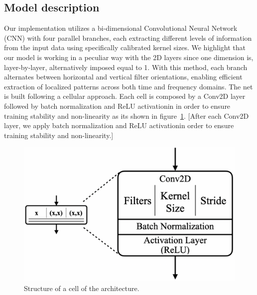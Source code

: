 \documentclass{article}
\begin{document}
\begin{sloppy}
\subsection{Model description}
\label{sec:model_description}
Our implementation utilizes a bi-dimensional Convolutional Neural Network (CNN)
with four parallel branches, each extracting different levels of information from the
input data using specifically calibrated kernel sizes. 
We highlight that our model is working in a peculiar way with the 2D layers since one dimension is, layer-by-layer, alternatively
imposed equal to 1. With this method, each branch alternates between horizontal and vertical filter orientations,
enabling efficient extraction of localized patterns across both time and frequency domains.
The net is built following a cellular approach. Each cell is composed by a Conv2D layer followed by batch normalization and
ReLU activationin in order to ensure training stability and non-linearity as its shown in figure~\ref{fig:simple_cell}.
[After each Conv2D layer, we apply batch normalization and ReLU activationin order to ensure training stability and non-linearity.]
\begin{figure}[ht]
  \centering
  \centerline{\includegraphics[width=\columnwidth]{simple_cell.png}}
  \caption{Structure of a cell of the architecture.}
  \label{fig:simple_cell}
\end{figure}


\end{sloppy}
\end{document}
